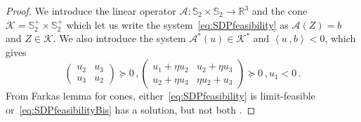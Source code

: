 \documentclass[a4paper,12pt]{article}
\newcommand{\proscal}[2]{\left\langle#1\:,#2\right\rangle}
\newcommand{\RR}{\mathbb{R}}
\begin{document}
\begin{proof}
{We introduce the linear operator 
$\mathcal{A} : \mathbb{S}_2 \times \mathbb{S}_2 \to \RR^3$
and the cone $\mathcal{K} = \mathbb{S}_2^+ \times \mathbb{S}_2^+$
which let us write the system~\eqref{eq:SDPfeasibility}
as $\mathcal{A}(Z) = b$ and $Z \in \mathcal{K}$.
We also introduce 
the system $\mathcal{A}^*(u) \in \mathcal{K}^*$
and $\proscal{u}{b} < 0$, which gives
\begin{equation}
	\label{eq:SDPfeasibilityBis}
	\begin{pmatrix}
	u_2 & u_3 \\
	u_3 & u_2
	\end{pmatrix} \succeq 0
	\,,
	\begin{pmatrix}
	u_1 + \eta u_2 & u_2 + \eta u_3 \\
	u_2 + \eta u_3 & \eta u_2 + u_3
	\end{pmatrix} \succeq 0
	\,, u_1 < 0 \,.
\end{equation}
From Farkas lemma for cones, either~\eqref{eq:SDPfeasibility}
is limit-feasible or~\eqref{eq:SDPfeasibilityBis}
has a solution, but not both \cite[Lemma 4.5.6]{gm12}. 

}
\end{proof}
\end{document}
